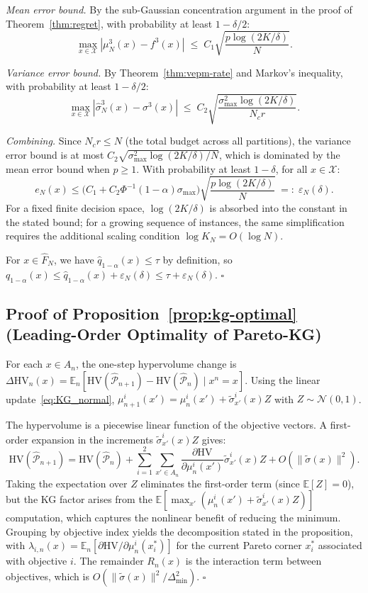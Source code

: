 \documentclass[12pt]{article}
\theoremstyle{plain}
\theoremstyle{definition}
\theoremstyle{remark}
\begin{document}
\emph{Mean error bound.}
By the sub-Gaussian concentration argument in the proof of Theorem~\ref{thm:regret},
with probability at least $1-\delta/2$:
\[
  \max_{x \in \mathcal{X}} |\mu^3_N(x) - f^3(x)|
  \;\leq\; C_1 \sqrt{\frac{p \log(2K/\delta)}{N}}.
\]

\emph{Variance error bound.}
By Theorem~\ref{thm:vepm-rate} and Markov's inequality,
with probability at least $1-\delta/2$:
\[
  \max_{x \in \mathcal{X}} |\hat{\sigma}^3_N(x) - \sigma^3(x)|
  \;\leq\; C_2 \sqrt{\frac{\sigma^2_{\max} \log(2K/\delta)}{N_c r}}.
\]

\emph{Combining.}
Since $N_c r \leq N$ (the total budget across all partitions), the variance
error bound is at most $C_2\sqrt{\sigma^2_{\max}\log(2K/\delta)/N}$, which
is dominated by the mean error bound when $p \geq 1$.
With probability at least $1-\delta$, for all $x \in \mathcal{X}$:
\[
  e_N(x) \leq \bigl(C_1 + C_2 \Phi^{-1}(1-\alpha) \sigma_{\max}\bigr)
  \sqrt{\frac{p \log(2K/\delta)}{N}}
  \;=:\; \varepsilon_N(\delta).
\]
For a fixed finite decision space, $\log(2K/\delta)$ is absorbed into
the constant in the stated bound; for a growing sequence of instances,
the same simplification requires the additional scaling condition
$\log K_N=O(\log N)$.

For $x \in \hat{F}_N$, we have $\hat{q}_{1-\alpha}(x) \leq \tau$ by definition,
so $q_{1-\alpha}(x) \leq \hat{q}_{1-\alpha}(x) + \varepsilon_N(\delta) \leq \tau + \varepsilon_N(\delta)$.
\hfill$\square$

\subsection{Proof of Proposition~\ref{prop:kg-optimal} (Leading-Order Optimality of Pareto-KG)}\label{app:proof_pareto_kg}

For each $x \in A_n$, the one-step hypervolume change is
$\Delta\mathrm{HV}_n(x) = \mathbb{E}_n[\mathrm{HV}(\hat{\mathcal{P}}_{n+1}) - \mathrm{HV}(\hat{\mathcal{P}}_n) \mid x^n = x]$.
Using the linear update~\eqref{eq:KG_normal},
$\mu^i_{n+1}(x') = \mu^i_n(x') + \tilde{\sigma}^i_{x'}(x) Z$ with $Z \sim \mathcal{N}(0,1)$.

The hypervolume is a piecewise linear function of the objective vectors.
A first-order expansion in the increments $\tilde{\sigma}^i_{x'}(x) Z$ gives:
\[
  \mathrm{HV}(\hat{\mathcal{P}}_{n+1})
  = \mathrm{HV}(\hat{\mathcal{P}}_n)
  + \sum_{i=1}^{2} \sum_{x' \in A_n} \frac{\partial \mathrm{HV}}{\partial \mu^i_n(x')}
    \tilde{\sigma}^i_{x'}(x) Z
  + O(\|\tilde{\sigma}(x)\|^2).
\]
Taking the expectation over $Z$ eliminates the first-order term (since
$\mathbb{E}[Z]=0$), but the KG factor arises from the
$\mathbb{E}[\max_{x'} (\mu^i_n(x') + \tilde{\sigma}^i_{x'}(x) Z)]$ computation,
which captures the nonlinear benefit of reducing the minimum.  Grouping
by objective index yields the decomposition stated in the proposition,
with $\lambda_{i,n}(x) = \mathbb{E}_n[\partial \mathrm{HV} / \partial \mu^i_n(x^*_i)]$
for the current Pareto corner $x^*_i$ associated with objective $i$.
The remainder $R_n(x)$ is the interaction term between objectives, which is
$O(\|\tilde{\sigma}(x)\|^2/\Delta_{\min}^2)$.
\hfill$\square$
\end{document}
